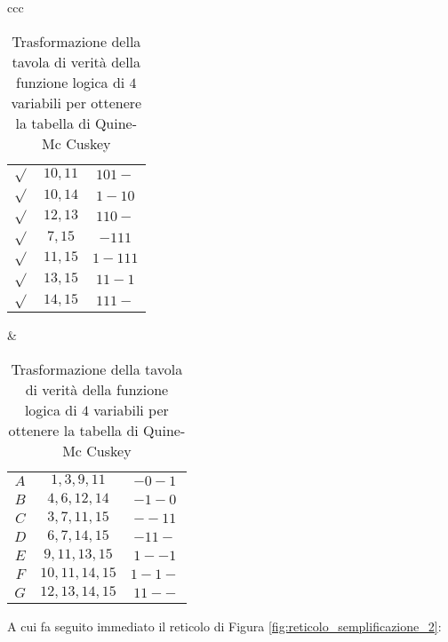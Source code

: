 \documentclass[a4paper]{extarticle}
\begin{document}
\begin{table}[H]
\begin{tabularx}{\textwidth}{ccc}
{\begin{tabular}{c|c|c}
             $\sqrt{}$ & $10,11$ & $101-$\\
             $\sqrt{}$ & $10,14$ & $1-10$\\
             $\sqrt{}$ & $12,13$ & $110-$\\
             \hline
             $\sqrt{}$ & $7,15$ & $-111$\\
             $\sqrt{}$ & $11,15$ & $1-111$\\
             $\sqrt{}$ & $13,15$ & $11-1$\\
             $\sqrt{}$ & $14,15$ & $111-$\\
        \end{tabular}
    }
    &
    {
        \hspace{-1em}
        \setlength{\tabcolsep}{3.5pt}
        \begin{tabular}{c|c|c}
             $A$ & $1,3,9,11$ & $-0-1$\\
             $B$ & $4,6,12,14$ & $-1-0$\\
             \hline
             $C$ & $3,7,11,15$ & $--11$\\
             $D$ & $6,7,14,15$ & $-11-$\\
             $E$ & $9,11,13,15$ & $1--1$\\
             $F$ & $10,11,14,15$ & $1-1-$\\
             $G$ & $12,13,14,15$ & $11--$\\
        \end{tabular}
    }
    \end{tabularx}
    \caption{Trasformazione della tavola di verità della funzione logica di \(4\) variabili per ottenere la tabella di Quine-Mc Cuskey}
    \label{tab:tavola_verita_Quine_Mc_Cuskey_4_variabili}
\end{table}

\noindent
A cui fa seguito immediato il reticolo di Figura \ref{fig:reticolo_semplificazione_2}:
\end{document}
